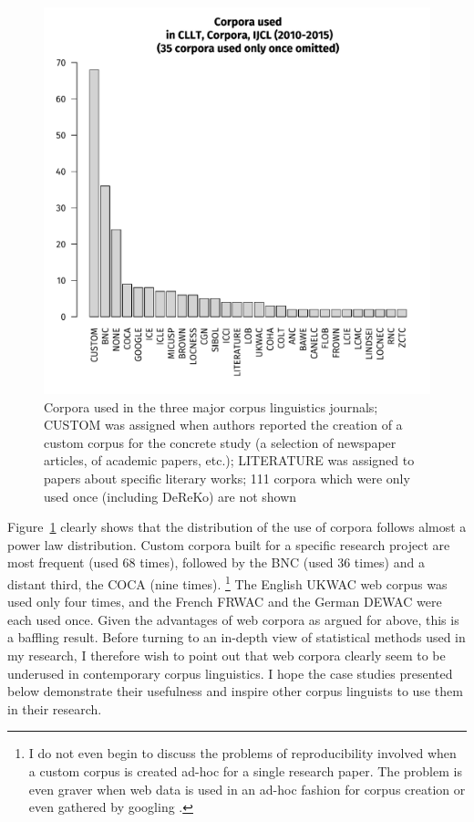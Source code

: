 \begin{figure}[htpb]
  \centering
  \includegraphics[width=\textwidth]{graphics/corpususe}
  \caption{Corpora used in the three major corpus linguistics journals; CUSTOM was assigned when authors reported the creation of a custom corpus for the concrete study (a selection of newspaper articles, of academic papers, etc.); LITERATURE was assigned to papers about specific literary works; 111 corpora which were only used once (including DeReKo) are not shown}
  \label{fig:corpususe}
\end{figure}

Figure~\ref{fig:corpususe} clearly shows that the distribution of the use of corpora follows almost a power law distribution.
Custom corpora built for a specific research project are most frequent (used 68 times), followed by the BNC (used 36 times) and a distant third, the COCA (nine times).%
\footnote{I do not even begin to discuss the problems of reproducibility involved when a custom corpus is created ad-hoc for a single research paper.
The problem is even graver when web data is used in an ad-hoc fashion for corpus creation or even gathered by googling \citep{Kilgarriff2006}.}
The English UKWAC web corpus was used only four times, and the French FRWAC and the German DEWAC were each used once.
Given the advantages of web corpora as argued for above, this is a baffling result.
Before turning to an in-depth view of statistical methods used in my research, I therefore wish to point out that web corpora clearly seem to be underused in contemporary corpus linguistics.
I hope the case studies presented below demonstrate their usefulness and inspire other corpus linguists to use them in their research.

